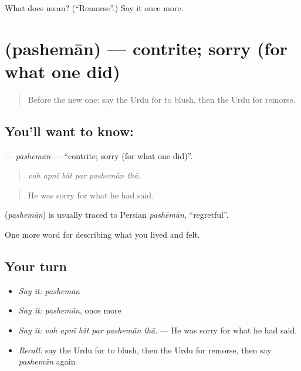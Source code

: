 \begin{tcolorbox}[breakable,colback=teal!4,colframe=teal!35!black,title={Before you move on}]
What does  mean? (\textquotedblleft{}Remorse\textquotedblright{}.) Say it once more.
\end{tcolorbox}
\section[\texorpdfstring{\ur{پشیمان} (pashemān)}{پشیمان (pashemān)}]{ (pashemān) — contrite; sorry (for what one did)}

\label{lesson:UR-C451-pasheman}



\begin{quote}
Before the new one: say the Urdu for to blush, then the Urdu for remorse.
\end{quote}

\subsection*{You'll want to know: }
\textbf{} — \emph{pashemān} — \textquotedblleft{}contrite; sorry (for what one did)\textquotedblright{}.

\begin{quote}
     
\end{quote}

\begin{quote}
\emph{voh apnī bāt par pashemān thā.}
\end{quote}

\begin{quote}
He was sorry for what he had said.
\end{quote}

\begin{cousinweb}
\textbf{} (\emph{pashemān}) is usually traced to Persian \emph{pashēmān}, \textquotedblleft{}regretful\textquotedblright{}.
\end{cousinweb}

\begin{grammarlens}[title={What you've built}]
One more word for describing what you lived and felt.
\end{grammarlens}

\subsection*{Your turn}
\begin{itemize}
\raggedright
  \item \emph{Say it:} \emph{pashemān}
  \item \emph{Say it:} \emph{pashemān}, once more
  \item \emph{Say it:} \emph{voh apnī bāt par pashemān thā.} — He was sorry for what he had said.
  \item \emph{Recall:} say the Urdu for to blush, then the Urdu for remorse, then say \emph{pashemān} again
\end{itemize}

